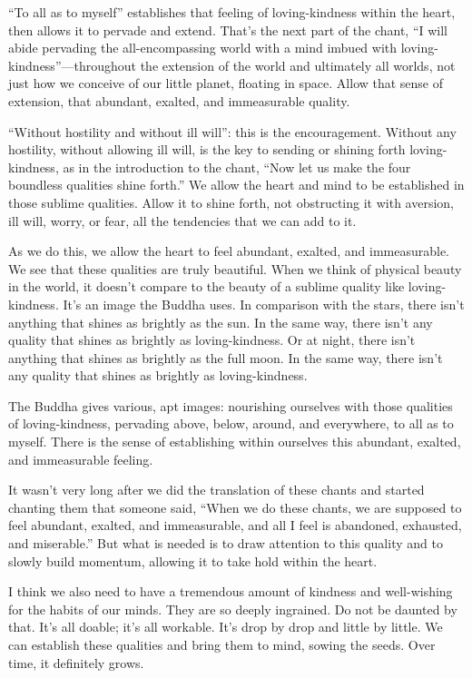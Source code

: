 “To all as to myself” establishes that feeling of loving-kindness within
the heart, then allows it to pervade and extend. That’s the next part of
the chant, “I will abide pervading the all-encompassing world with a
mind imbued with loving-kindness”—throughout the extension of the world
and ultimately all worlds, not just how we conceive of our little
planet, floating in space. Allow that sense of extension, that abundant,
exalted, and immeasurable quality.

“Without hostility and without ill will”: this is the encouragement.
Without any hostility, without allowing ill will, is the key to sending
or shining forth loving-kindness, as in the introduction to the chant,
“Now let us make the four boundless qualities shine forth.” We allow the
heart and mind to be established in those sublime qualities. Allow it to
shine forth, not obstructing it with aversion, ill will, worry, or fear,
all the tendencies that we can add to it.

As we do this, we allow the heart to feel abundant, exalted, and
immeasurable. We see that these qualities are truly beautiful. When we
think of physical beauty in the world, it doesn’t compare to the beauty
of a sublime quality like loving-kindness. It’s an image the Buddha
uses. In comparison with the stars, there isn’t anything that shines as
brightly as the sun. In the same way, there isn’t any quality that
shines as brightly as loving-kindness. Or at night, there isn’t anything
that shines as brightly as the full moon. In the same way, there isn’t
any quality that shines as brightly as loving-kindness.

The Buddha gives various, apt images: nourishing ourselves with those
qualities of loving-kindness, pervading above, below, around, and
everywhere, to all as to myself. There is the sense of establishing
within ourselves this abundant, exalted, and immeasurable feeling.

It wasn’t very long after we did the translation of these chants and
started chanting them that someone said, “When we do these chants, we
are supposed to feel abundant, exalted, and immeasurable, and all I feel
is abandoned, exhausted, and miserable.” But what is needed is to draw
attention to this quality and to slowly build momentum, allowing it to
take hold within the heart.

I think we also need to have a tremendous amount of kindness and
well-wishing for the habits of our minds. They are so deeply ingrained.
Do not be daunted by that. It’s all doable; it’s all workable. It’s drop
by drop and little by little. We can establish these qualities and bring
them to mind, sowing the seeds. Over time, it definitely grows.

